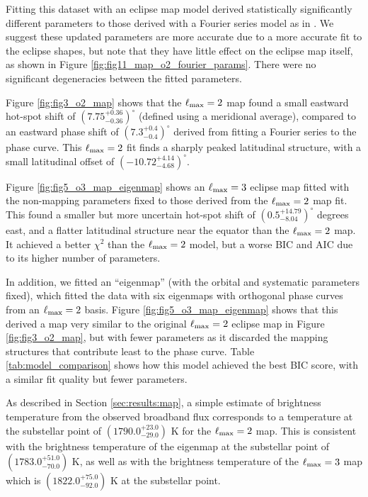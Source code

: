 \documentclass[twocolumn]{aastex631}
\begin{document}
Fitting this dataset with an eclipse map model derived statistically significantly different parameters to those derived with a Fourier series model as in \citet{bell2023wasp43b}. We suggest these updated parameters are more accurate due to a more accurate fit to the eclipse shapes, but note that they have little effect on the eclipse map itself, as shown in Figure \ref{fig:fig11_map_o2_fourier_params}. There were no significant degeneracies between the fitted parameters.

Figure \ref{fig:fig3_o2_map} shows that the $\ell_{\rm max}=2$ map found a small eastward hot-spot shift of $(7.75^{+0.36}_{-0.36})^{\circ}$ (defined using a meridional average), compared to an eastward phase shift of $(7.3^{+0.4}_{-0.4})^{\circ}$ derived from fitting a Fourier series to the phase curve. This $\ell_{\rm max}=2$ fit finds a sharply peaked latitudinal structure, with a small latitudinal offset of $( -10.72 ^{+ 4.14 } _{- 4.68 })^{\circ}$.

Figure \ref{fig:fig5_o3_map_eigenmap} shows an $\ell_{\rm max}=3$ eclipse map fitted with the non-mapping parameters fixed to those derived from the $\ell_{\rm max}=2$ map fit. This found a smaller but more uncertain hot-spot shift of $( 0.5 ^{+ 14.79 } _{- 8.04 })^{\circ}$ degrees east, and a flatter latitudinal structure near the equator than the $\ell_{\rm max}=2$ map. It achieved a better $\chi^{2}$ than the $\ell_{\rm max}=2$ model, but a worse BIC and AIC due to its higher number of parameters.

In addition, we fitted an ``eigenmap'' (with the orbital and systematic parameters fixed), which fitted the data with six eigenmaps with orthogonal phase curves from an $\ell_{\rm max}=2$ basis. Figure \ref{fig:fig5_o3_map_eigenmap} shows that this derived a map very similar to the original $\ell_{\rm max}=2$  eclipse map in Figure \ref{fig:fig3_o2_map}, but with fewer parameters as it discarded the mapping structures that contribute least to the phase curve. Table \ref{tab:model_comparison} shows how this model achieved the best BIC score, with a similar fit quality but fewer parameters.

As described in Section \ref{sec:results:map}, a simple estimate of brightness temperature from the observed broadband flux corresponds to a temperature at the substellar point of $( 1790.0 ^{+ 23.0 } _{- 29.0 }) $ K for the $\ell_{\rm max}=2$ map. This is consistent with the brightness temperature of the eigenmap at the substellar point of $( 1783.0 ^{+ 51.0 } _{- 70.0 }) $ K, as well as with the brightness temperature of the $\ell_{\rm max}=3$ map which is $( 1822.0 ^{+ 75.0 } _{- 92.0 }) $ K at the substellar point.
\end{document}

